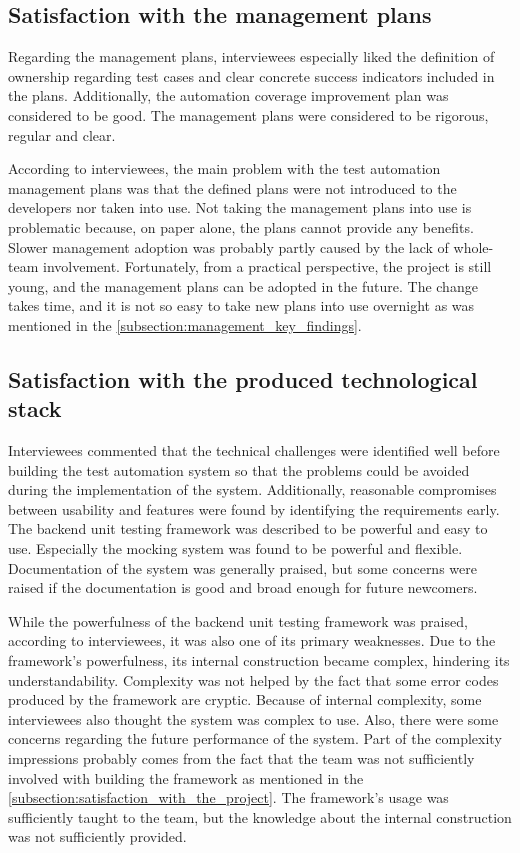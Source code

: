 \subsection{Satisfaction with the management plans}
Regarding the management plans, interviewees especially liked the definition of ownership regarding test cases and clear concrete success indicators included in the plans. Additionally, the automation coverage improvement plan was considered to be good. The management plans were considered to be rigorous, regular and clear.

According to interviewees, the main problem with the test automation management plans was that the defined plans were not introduced to the developers nor taken into use. Not taking the management plans into use is problematic because, on paper alone, the plans cannot provide any benefits. Slower management adoption was probably partly caused by the lack of whole-team involvement. Fortunately, from a practical perspective, the project is still young, and the management plans can be adopted in the future. The change takes time, and it is not so easy to take new plans into use overnight as was mentioned in the \autoref{subsection:management_key_findings}.

\subsection{Satisfaction with the produced technological stack}\label{subsection:satisfaction_with_the_produced_technological_stack}
Interviewees commented that the technical challenges were identified well before building the test automation system so that the problems could be avoided during the implementation of the system. Additionally, reasonable compromises between usability and features were found by identifying the requirements early. The backend unit testing framework was described to be powerful and easy to use. Especially the mocking system was found to be powerful and flexible. Documentation of the system was generally praised, but some concerns were raised if the documentation is good and broad enough for future newcomers.

While the powerfulness of the backend unit testing framework was praised, according to interviewees, it was also one of its primary weaknesses. Due to the framework's powerfulness, its internal construction became complex, hindering its understandability. Complexity was not helped by the fact that some error codes produced by the framework are cryptic. Because of internal complexity, some interviewees also thought the system was complex to use. Also, there were some concerns regarding the future performance of the system. Part of the complexity impressions probably comes from the fact that the team was not sufficiently involved with building the framework as mentioned in the \autoref{subsection:satisfaction_with_the_project}. The framework's usage was sufficiently taught to the team, but the knowledge about the internal construction was not sufficiently provided.

